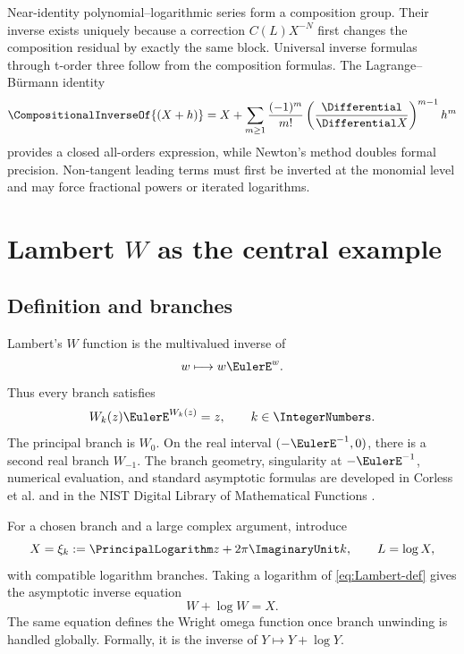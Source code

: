 \documentclass[11pt,openany]{book}
\theoremstyle{definition}
\theoremstyle{plain}
\theoremstyle{remark}
\newcommand{\rev}[1]{\CompositionalInverseOf{#1}}
\begin{document}
\begin{summarybox}
Near-identity polynomial--logarithmic series form a composition group.  Their
inverse exists uniquely because a correction \(C(L)X^{-N}\) first changes the
composition residual by exactly the same block.  Universal inverse formulas
through t-order three follow from the composition formulas.  The
Lagrange--Bürmann identity
\[
 \rev{(X+h)}=X+\sum_{m\ge1}\frac{(-1)^m}{m!}
 \left(\frac{\Differential}{\Differential X}\right)^{m-1}h^m
\]
provides a closed all-orders expression, while Newton's method doubles formal
precision.  Non-tangent leading terms must first be inverted at the monomial
level and may force fractional powers or iterated logarithms.
\end{summarybox}

\chapter{Lambert \texorpdfstring{\(W\)}{W} as the central example}\label{ch:lambert}

\section{Definition and branches}
Lambert's \(W\) function is the multivalued inverse of
\[
 w\longmapsto w\EulerE^w.
\]
Thus every branch satisfies
\begin{equation}\label{eq:Lambert-def}
 W_k(z)\EulerE^{W_k(z)}=z,
 \qquad k\in\IntegerNumbers.
\end{equation}
The principal branch is \(W_0\).  On the real interval \((-\EulerE^{-1},0)\), there
is a second real branch \(W_{-1}\).  The branch geometry, singularity at
\(-\EulerE^{-1}\), numerical evaluation, and standard asymptotic formulas are
developed in Corless et al. and in the NIST Digital Library of Mathematical
Functions \cite{corless-lambert,dlmf-lambert}.

For a chosen branch and a large complex argument, introduce
\begin{equation}\label{eq:xi-k}
 X=\xi_k:=\PrincipalLogarithm z+2\pi\ImaginaryUnit k,
 \qquad L=\log X,
\end{equation}
with compatible logarithm branches.  Taking a logarithm of
\cref{eq:Lambert-def} gives the asymptotic inverse equation
\begin{equation}\label{eq:W-log-equation}
 W+\log W=X.
\end{equation}
The same equation defines the Wright omega function once branch unwinding is
handled globally.  Formally, it is the inverse of \(Y\mapsto Y+\log Y\).
\end{document}
